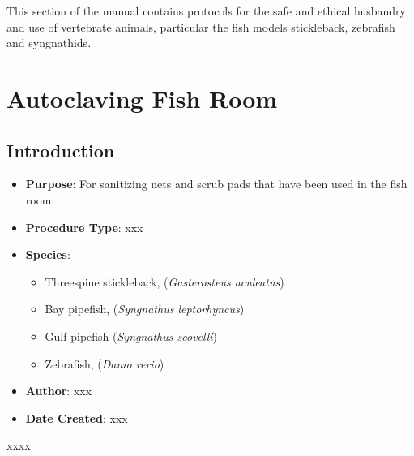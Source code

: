\documentclass[
  letterpaper,
  DIV=11,
  numbers=noendperiod]{scrreprt}
\providecommand{\tightlist}{%
  \setlength{\itemsep}{0pt}\setlength{\parskip}{0pt}}\usepackage{longtable,booktabs,array}
\begin{document}
This section of the manual contains protocols for the safe and ethical
husbandry and use of vertebrate animals, particular the fish models
stickleback, zebrafish and syngnathids.

\hypertarget{sec-husbandry-autoclaving}{%
\chapter{Autoclaving Fish Room}\label{sec-husbandry-autoclaving}}

\hypertarget{introduction-27}{%
\section{Introduction}\label{introduction-27}}

\begin{itemize}
\tightlist
\item
  \textbf{Purpose}: For sanitizing nets and scrub pads that have been
  used in the fish room.
\item
  \textbf{Procedure Type}: xxx
\item
  \textbf{Species}:

  \begin{itemize}
  \tightlist
  \item
    Threespine stickleback, (\emph{Gasterosteus aculeatus})
  \item
    Bay pipefish, (\emph{Syngnathus leptorhyncus})
  \item
    Gulf pipefish (\emph{Syngnathus scovelli})
  \item
    Zebrafish, (\emph{Danio rerio})
  \end{itemize}
\item
  \textbf{Author}: xxx
\item
  \textbf{Date Created}: xxx
\end{itemize}

\begin{tcolorbox}[enhanced jigsaw, rightrule=.15mm, title=\textcolor{quarto-callout-warning-color}{\faExclamationTriangle}\hspace{0.5em}{NOTES}, titlerule=0mm, opacitybacktitle=0.6, toprule=.15mm, bottomrule=.15mm, opacityback=0, left=2mm, colframe=quarto-callout-warning-color-frame, breakable, coltitle=black, colback=white, colbacktitle=quarto-callout-warning-color!10!white, bottomtitle=1mm, leftrule=.75mm, toptitle=1mm, arc=.35mm]

xxxx

\end{tcolorbox}
\end{document}
